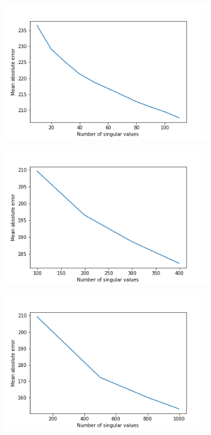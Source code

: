 \documentclass[11pt]{article}
\begin{document}
\begin{figure}[] 
\centering
    \begin{subfigure}[!t]{0.31\textwidth}
        \includegraphics[width=\textwidth]{Plots/SVD_k_100.png}
    \end{subfigure}
        \begin{subfigure}[!t]{0.31\textwidth}
        \includegraphics[width=\textwidth]{Plots/SVD_k_400.png}
    \end{subfigure}
            \begin{subfigure}[!t]{0.31\textwidth}
        \includegraphics[width=\textwidth]{Plots/SVD_k_1000.png}

\end{subfigure}
\end{figure}
\end{document}
